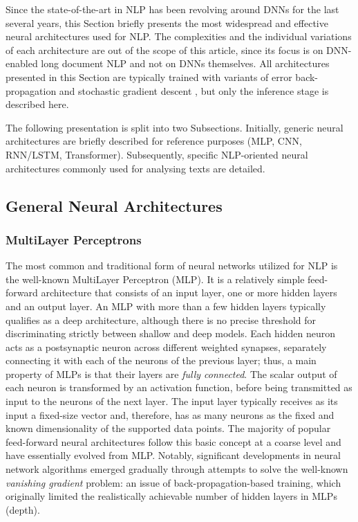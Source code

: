 \documentclass[preprint,review,10pt]{elsarticle}
\begin{document}
	Since the state-of-the-art in NLP has been revolving around DNNs for the last several years, this Section briefly presents the most widespread and effective neural architectures used for NLP. The complexities and the individual variations of each architecture are out of the scope of this article, since its focus is on DNN-enabled long document NLP and not on DNNs themselves. All architectures presented in this Section are typically trained with variants of error back-propagation and stochastic gradient descent \cite{rumelhart} \cite{jordan}, but only the inference stage is described here.
	
	The following presentation is split into two Subsections. Initially, generic neural architectures are briefly described for reference purposes (MLP, CNN, RNN/LSTM, Transformer). Subsequently, specific NLP-oriented neural architectures commonly used for analysing texts are detailed.
	
	
	\subsection{General Neural Architectures}
	
	\subsubsection{MultiLayer Perceptrons}
	The most common and traditional form of neural networks utilized for NLP is the well-known MultiLayer Perceptron (MLP). It is a relatively simple feed-forward architecture that consists of an input layer, one or more hidden layers and an output layer. An MLP with more than a few hidden layers typically qualifies as a deep architecture, although there is no precise threshold for discriminating strictly between shallow and deep models. Each hidden neuron acts as a postsynaptic neuron across different weighted synapses, separately connecting it with each of the neurons of the previous layer; thus, a main property of MLPs is that their layers are \textit{fully connected}. The scalar output of each neuron is transformed by an activation function, before being transmitted as input to the neurons of the next layer. The input layer typically receives as its input a fixed-size vector and, therefore, has as many neurons as the fixed and known dimensionality of the supported data points. Τhe majority of popular feed-forward neural architectures follow this basic concept at a coarse level and have essentially evolved from MLP. Notably, significant developments in neural network algorithms emerged gradually through attempts to solve the well-known \textit{vanishing gradient} problem: an issue of back-propagation-based training, which originally limited the realistically achievable number of hidden layers in MLPs (depth).
	
\end{document}
